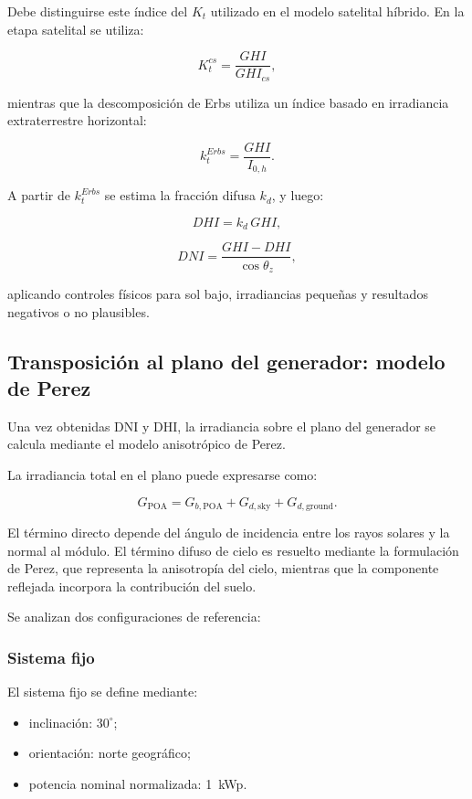 \documentclass[11pt,a4paper]{article}
\begin{document}
Debe distinguirse este índice del $K_t$ utilizado en el modelo satelital híbrido. En la etapa satelital se utiliza:

\[
K_t^{cs}=\frac{GHI}{GHI_{cs}},
\]

mientras que la descomposición de Erbs utiliza un índice basado en irradiancia extraterrestre horizontal:

\[
k_t^{Erbs}
=
\frac{GHI}{I_{0,h}}.
\]

A partir de $k_t^{Erbs}$ se estima la fracción difusa $k_d$, y luego:

\[
DHI = k_d\,GHI,
\]

\[
DNI=
\frac{GHI-DHI}{\cos\theta_z},
\]

aplicando controles físicos para sol bajo, irradiancias pequeñas y resultados negativos o no plausibles.

\subsection{Transposición al plano del generador: modelo de Perez}

Una vez obtenidas DNI y DHI, la irradiancia sobre el plano del generador se calcula mediante el modelo anisotrópico de Perez.

La irradiancia total en el plano puede expresarse como:

\[
G_{\mathrm{POA}}
=
G_{b,\mathrm{POA}}
+
G_{d,\mathrm{sky}}
+
G_{d,\mathrm{ground}}.
\]

El término directo depende del ángulo de incidencia entre los rayos solares y la normal al módulo. El término difuso de cielo es resuelto mediante la formulación de Perez, que representa la anisotropía del cielo, mientras que la componente reflejada incorpora la contribución del suelo.

Se analizan dos configuraciones de referencia:

\subsubsection{Sistema fijo}

El sistema fijo se define mediante:

\begin{itemize}
    \item inclinación: $30^\circ$;
    \item orientación: norte geográfico;
    \item potencia nominal normalizada: 1~kWp.
\end{itemize}
\end{document}
